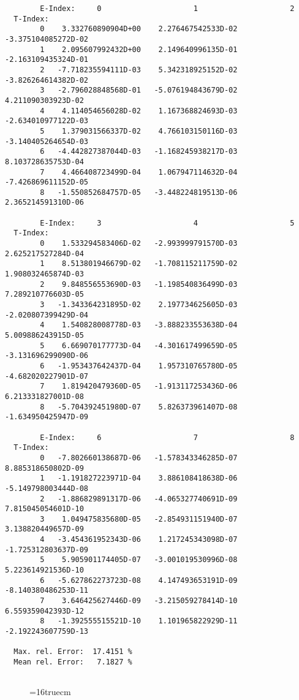 \documentclass[12pt,dvipdfmx]{article}
\begin{document}
\begin{small}\begin{verbatim}
        E-Index:     0                     1                     2
  T-Index:
        0    3.332760890904D+00    2.276467542533D-02   -3.375104085272D-02
        1    2.095607992432D+00    2.149640996135D-01   -2.163109435324D-01
        2   -7.718235594111D-03    5.342318925152D-02   -3.826264614382D-02
        3   -2.796028848568D-01   -5.076194843679D-02    4.211090303923D-02
        4    4.114054656028D-02    1.167368824693D-03   -2.634010977122D-03
        5    1.379031566337D-02    4.766103150116D-03   -3.140405264654D-03
        6   -4.442827387044D-03   -1.168245938217D-03    8.103728635753D-04
        7    4.466408723499D-04    1.067947114632D-04   -7.426869611152D-05
        8   -1.550852684757D-05   -3.448224819513D-06    2.365214591310D-06

        E-Index:     3                     4                     5
  T-Index:
        0    1.533294583406D-02   -2.993999791570D-03    2.625217527284D-04
        1    8.513801946679D-02   -1.708115211759D-02    1.908032465874D-03
        2    9.848556553690D-03   -1.198540836499D-03    7.289210776603D-05
        3   -1.343364231895D-02    2.197734625605D-03   -2.020807399429D-04
        4    1.540828008778D-03   -3.888233553638D-04    5.009886243915D-05
        5    6.669070177773D-04   -4.301617499659D-05   -3.131696299090D-06
        6   -1.953437642437D-04    1.957310765780D-05   -4.682020227901D-07
        7    1.819420479360D-05   -1.913117253436D-06    6.213331827001D-08
        8   -5.704392451980D-07    5.826373961407D-08   -1.634950425947D-09

        E-Index:     6                     7                     8
  T-Index:
        0   -7.802660138687D-06   -1.578343346285D-07    8.885318650802D-09
        1   -1.191827223971D-04    3.886108418638D-06   -5.149798003444D-08
        2   -1.886829891317D-06   -4.065327740691D-09    7.815045054601D-10
        3    1.049475835680D-05   -2.854931151940D-07    3.138820449657D-09
        4   -3.454361952343D-06    1.217245343098D-07   -1.725312803637D-09
        5    5.905901174405D-07   -3.001019530996D-08    5.223614921536D-10
        6   -5.627862273723D-08    4.147493653191D-09   -8.140380486253D-11
        7    3.646425627446D-09   -3.215059278414D-10    6.559359042393D-12
        8   -1.392555515521D-10    1.101965822929D-11   -2.192243607759D-13

  Max. rel. Error:  17.4151 %
  Mean rel. Error:   7.1827 %


\end{verbatim}\end{small}
\begin{figure} \label{2.1.8lr2o}
\epsfxsize=16truecm
\end{figure}
\newpage
\end{document}
